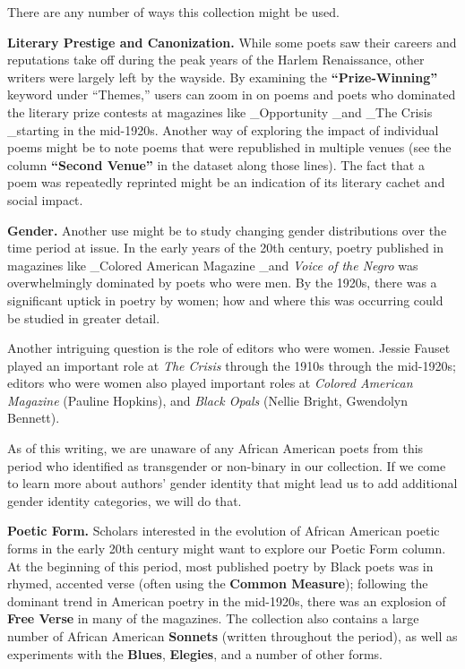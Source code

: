 \documentclass[
  letterpaper,
  DIV=11,
  numbers=noendperiod]{scrartcl}
\begin{document}
There are any number of ways this collection might be used.

\textbf{Literary Prestige and Canonization.} While some poets saw their
careers and reputations take off during the peak years of the Harlem
Renaissance, other writers were largely left by the wayside. By
examining the \textbf{``Prize-Winning'' }keyword under ``Themes,'' users
can zoom in on poems and poets who dominated the literary prize contests
at magazines like \_Opportunity \_and \_The Crisis \_starting in the
mid-1920s. Another way of exploring the impact of individual poems might
be to note poems that were republished in multiple venues (see the
column \textbf{``Second Venue''} in the dataset along those lines). The
fact that a poem was repeatedly reprinted might be an indication of its
literary cachet and social impact.

\textbf{Gender.} Another use might be to study changing gender
distributions over the time period at issue. In the early years of the
20th century, poetry published in magazines like \_Colored American
Magazine \_and \emph{Voice of the Negro} was overwhelmingly dominated by
poets who were men. By the 1920s, there was a significant uptick in
poetry by women; how and where this was occurring could be studied in
greater detail.

Another intriguing question is the role of editors who were women.
Jessie Fauset played an important role at \emph{The Crisis} through the
1910s through the mid-1920s; editors who were women also played
important roles at \emph{Colored American Magazine} (Pauline Hopkins),
and \emph{Black Opals} (Nellie Bright, Gwendolyn Bennett).

As of this writing, we are unaware of any African American poets from
this period who identified as transgender or non-binary in our
collection. If we come to learn more about authors' gender identity that
might lead us to add additional gender identity categories, we will do
that.

\textbf{Poetic Form.} Scholars interested in the evolution of African
American poetic forms in the early 20th century might want to explore
our Poetic Form column. At the beginning of this period, most published
poetry by Black poets was in rhymed, accented verse (often using the
\textbf{Common Measure}); following the dominant trend in American
poetry in the mid-1920s, there was an explosion of \textbf{Free Verse}
in many of the magazines. The collection also contains a large number of
African American \textbf{Sonnets} (written throughout the period), as
well as experiments with the \textbf{Blues}, \textbf{Elegies}, and a
number of other forms.
\end{document}
